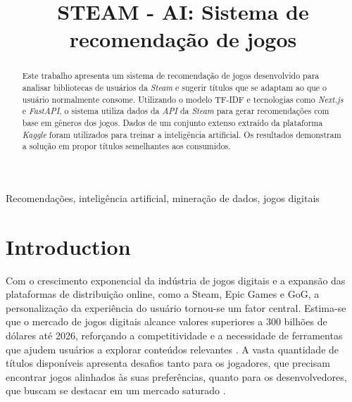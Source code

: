 \documentclass[conference]{IEEEtran}
\begin{document}
\title{STEAM - AI: Sistema de recomendação de jogos\\
}

\author{

\and

}

\maketitle

\begin{abstract}
Este trabalho apresenta um sistema de recomendação de jogos  desenvolvido para analisar bibliotecas de usuários da \textit{Steam} e sugerir títulos que se adaptam ao que o usuário normalmente consome. Utilizando o modelo TF-IDF e tecnologias como \textit{Next.js} e \textit{FastAPI}, o sistema utiliza dados da \textit{API} da \textit{Steam} para gerar recomendações com base em gêneros dos jogos. Dados de um conjunto extenso extraído da plataforma \textit{Kaggle} foram utilizados para treinar a inteligência artificial. Os resultados demonstram a solução em propor títulos semelhantes aos consumidos.
\end{abstract}

\begin{IEEEkeywords}
Recomendações, inteligência artificial, mineração de dados, jogos digitais
\end{IEEEkeywords}

\section{Introduction}

Com o crescimento exponencial da indústria de jogos digitais e a expansão das plataformas de distribuição online, como a Steam, Epic Games e GoG, a personalização da experiência do usuário tornou-se um fator central. Estima-se que o mercado de jogos digitais alcance valores superiores a 300 bilhões de dólares até 2026, reforçando a competitividade e a necessidade de ferramentas que ajudem usuários a explorar conteúdos relevantes \cite{c1}. A vasta quantidade de títulos disponíveis apresenta desafios tanto para os jogadores, que precisam encontrar jogos alinhados às suas preferências, quanto para os desenvolvedores, que buscam se destacar em um mercado saturado \cite{c2}.
\end{document}

